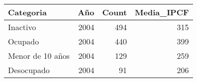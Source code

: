 \begin{tabular}{lrrr}
\toprule
Categoria & Año & Count & Media_IPCF \\
\midrule
Inactivo & 2004 & 494 & 315 \\
Ocupado & 2004 & 440 & 399 \\
Menor de 10 años & 2004 & 129 & 259 \\
Desocupado & 2004 & 91 & 206 \\
\bottomrule
\end{tabular}
